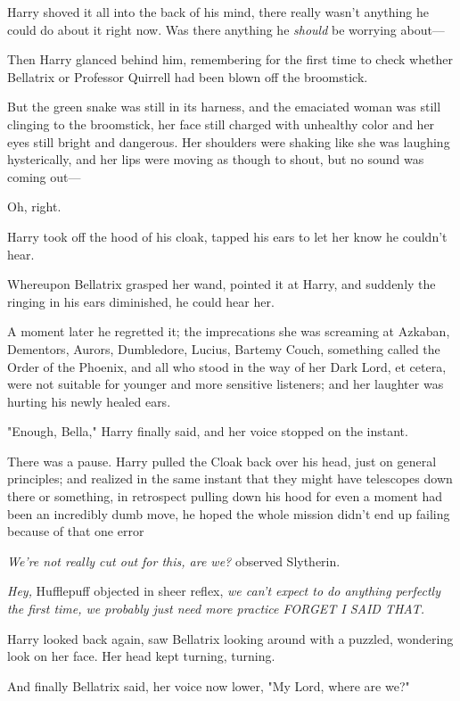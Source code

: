 Harry shoved it all into the back of his mind, there really wasn't anything he
could do about it right now. Was there anything he \emph{should} be worrying
about---

Then Harry glanced behind him, remembering for the first time to check whether
Bellatrix or Professor Quirrell had been blown off the broomstick.

But the green snake was still in its harness, and the emaciated woman was still
clinging to the broomstick, her face still charged with unhealthy color and her
eyes still bright and dangerous. Her shoulders were shaking like she was
laughing hysterically, and her lips were moving as though to shout, but no
sound was coming out---

Oh, right.

Harry took off the hood of his cloak, tapped his ears to let her know he
couldn't hear.

Whereupon Bellatrix grasped her wand, pointed it at Harry, and suddenly the
ringing in his ears diminished, he could hear her.

A moment later he regretted it; the imprecations she was screaming at Azkaban,
Dementors, Aurors, Dumbledore, Lucius, Bartemy Couch, something called the
Order of the Phoenix, and all who stood in the way of her Dark Lord, et cetera,
were not suitable for younger and more sensitive listeners; and her laughter
was hurting his newly healed ears.

"Enough, Bella," Harry finally said, and her voice stopped on the instant.

There was a pause. Harry pulled the Cloak back over his head, just on general
principles; and realized in the same instant that they might have telescopes
down there or something, in retrospect pulling down his hood for even a moment
had been an incredibly dumb move, he hoped the whole mission didn't end up
failing because of that one error{\el}

\emph{We're not really cut out for this, are we?} observed Slytherin.

\emph{Hey,} Hufflepuff objected in sheer reflex, \emph{we can't expect to do
anything perfectly the first time, we probably just need more practice FORGET I
SAID THAT.}

Harry looked back again, saw Bellatrix looking around with a puzzled, wondering
look on her face. Her head kept turning, turning.

And finally Bellatrix said, her voice now lower, "My Lord, where are we?"

